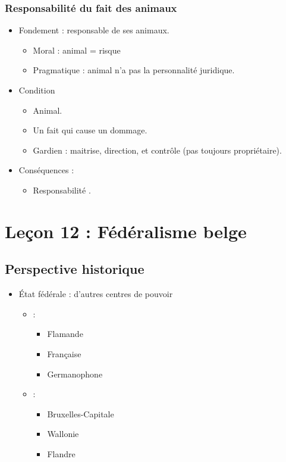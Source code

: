 \subsection{Responsabilité du fait des animaux}
\begin{itemize}
	\item Fondement : responsable de ses animaux.
	\begin{itemize}
		\item Moral : animal = risque
		\item Pragmatique : animal n'a pas la personnalité juridique.
	\end{itemize}
	\item Condition
	\begin{itemize}
		\item Animal.
		\item Un fait qui cause un dommage.
		\item Gardien : maitrise, direction, et contrôle (pas toujours propriétaire).
	\end{itemize}
	\item Conséquences :
	\begin{itemize}
		\item Responsabilité .
	\end{itemize}
\end{itemize}

\newpage
\chapter{Leçon 12 : Fédéralisme belge}

\section{Perspective historique}

\begin{itemize}
	\item État fédérale : d'autres centres de pouvoir
	\begin{itemize}
		\item {} :
		\begin{itemize}
			\item Flamande
			\item Française
			\item Germanophone
		\end{itemize}
		\item {} :
		\begin{itemize}
			\item Bruxelles-Capitale
			\item Wallonie
			\item Flandre
		\end{itemize}
	\end{itemize}
\end{itemize}

